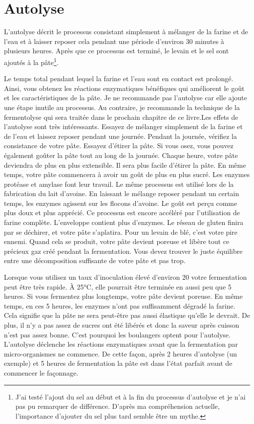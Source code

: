 \section{Autolyse}%
\label{section:autolysis}

L'autolyse décrit le processus consistant simplement à mélanger de la farine et de l'eau et à laisser reposer cela pendant une période d'environ 30 minutes à plusieurs heures. Après que ce processus est terminé, le levain et le sel sont ajoutés à la pâte\footnote{J'ai testé l'ajout du sel au début et à la fin du processus d'autolyse et je n'ai pas pu remarquer de différence. D'après ma compréhension actuelle, l'importance d'ajouter du sel plus tard semble être un mythe.}.

Le temps total pendant lequel la farine et l'eau sont en contact est prolongé. Ainsi, vous obtenez les réactions enzymatiques bénéfiques qui améliorent le goût et les caractéristiques de la pâte. Je ne recommande pas l'autolyse car elle ajoute une étape inutile au processus. Au contraire, je recommande la technique de la fermentolyse qui sera traitée dans le prochain chapitre de ce livre.Les effets de l'autolyse sont très intéressants. Essayez de mélanger simplement de la farine et
de l'eau et laissez reposer pendant une journée. Pendant la journée, vérifiez la consistance de
votre pâte. Essayez d'étirer la pâte. Si vous osez, vous pouvez également goûter la
pâte tout au long de la journée. Chaque heure, votre pâte deviendra
de plus en plus extensible. Il sera plus facile d'étirer la pâte. En même temps, votre
pâte commencera à avoir un goût de plus en plus sucré. Les enzymes protéase et amylase
font leur travail. Le même processus est utilisé lors de la fabrication du lait d'avoine. En laissant
le mélange reposer pendant un certain temps, les enzymes agissent sur les flocons d'avoine. Le goût est perçu comme
plus doux et plus apprécié. Ce processus est encore accéléré par l'utilisation de farine
complète. L'enveloppe contient plus d'enzymes. Le réseau de gluten
finira par se déchirer, et votre pâte s'aplatira. Pour un levain de blé, c'est
votre pire ennemi. Quand cela se produit, votre pâte devient poreuse et libère
tout ce précieux gaz créé pendant la fermentation. Vous devez trouver le
juste équilibre entre une décomposition suffisante de votre pâte et pas trop.

Lorsque vous utilisez un taux d'inoculation élevé d'environ 20%
votre fermentation peut être très rapide. À 25°C, elle pourrait être terminée en aussi peu que 5 heures.
Si vous fermentez plus longtemps, votre pâte devient poreuse. En même temps, en
ces 5 heures, les enzymes n'ont pas suffisamment dégradé la farine. Cela signifie
que la pâte ne sera peut-être pas aussi élastique qu'elle le devrait. De plus, il n'y a pas assez
de sucres ont été libérés et donc la saveur après cuisson n'est pas assez bonne. C'est pourquoi les boulangers optent pour l'autolyse. L'autolyse déclenche les réactions enzymatiques
avant que la fermentation par micro-organismes ne commence. De cette façon, après 2 heures
d'autolyse (un exemple) et 5 heures de fermentation la pâte est dans l'état
parfait avant de commencer le façonnage.


